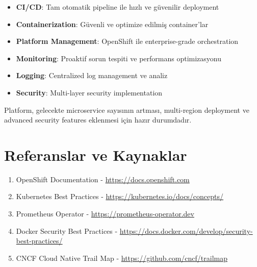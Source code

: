 \documentclass[12pt,a4paper]{article}
\begin{document}
\begin{itemize}
    \item \textbf{CI/CD}: Tam otomatik pipeline ile hızlı ve güvenilir deployment
    \item \textbf{Containerization}: Güvenli ve optimize edilmiş container'lar
    \item \textbf{Platform Management}: OpenShift ile enterprise-grade orchestration
    \item \textbf{Monitoring}: Proaktif sorun tespiti ve performans optimizasyonu
    \item \textbf{Logging}: Centralized log management ve analiz
    \item \textbf{Security}: Multi-layer security implementation
\end{itemize}

Platform, gelecekte microservice sayısının artması, multi-region deployment ve advanced security features eklenmesi için hazır durumdadır.

\section{Referanslar ve Kaynaklar}

\begin{enumerate}
    \item OpenShift Documentation - \url{https://docs.openshift.com}
    \item Kubernetes Best Practices - \url{https://kubernetes.io/docs/concepts/}
    \item Prometheus Operator - \url{https://prometheus-operator.dev}
    \item Docker Security Best Practices - \url{https://docs.docker.com/develop/security-best-practices/}
    \item CNCF Cloud Native Trail Map - \url{https://github.com/cncf/trailmap}
\end{enumerate}
\end{document}
